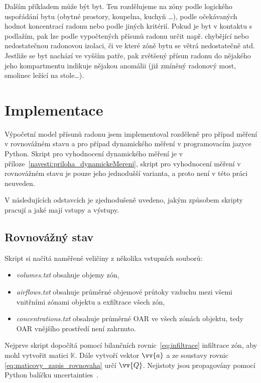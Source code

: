 Dalším příkladem může být byt. Ten rozdělujeme na zóny podle logického uspořádání bytu (obytné prostory, koupelna, kuchyň \ldots), podle očekávaných hodnot koncentrací radonu nebo podle jiných kritérií.
Pokud je byt v kontaktu s podlažím, pak lze podle vypočtených přísunů radonu určit např. chybějící nebo nedostatečnou radonovou izolaci, či ve které zóně bytu se větrá nedostatečně atd. Jestliže se byt nachází ve vyšším patře, pak zvětšený přísun radonu do nějakého jeho kompartmentu indikuje nějakou anomálii (již zmíněný radonový most, smolinec ležící na stole\ldots).

\section{Implementace}
Výpočetní model přísunů radonu jsem implementoval rozděleně pro případ měření v rovnovážném stavu a pro případ dynamického měření v programovacím jazyce Python. Skript pro vyhodnocení dynamického měření je v příloze~\ref{navesti:priloha_dynamickeMereni}, skript pro vyhodnocení měření v rovnovážném stavu je pouze jeho jednodušší varianta, a proto není v této práci neuveden.

V následujících odstavcích je zjednodušeně uvedeno, jakým způsobem skripty pracují a jaké mají vstupy a výstupy.
\subsection{Rovnovážný stav}
Skript si načítá naměřené veličiny z několika vstupních souborů:
\begin{itemize}
    \item\emph{volumes.txt} obsahuje objemy zón,
    \item\emph{airflows.txt} obsahuje průměrné objemové průtoky vzduchu mezi všemi  vnitřními zónami objektu a exfiltrace všech zón,
    \item\emph{concentrations.txt} obsahuje průměrné OAR ve všech zónách objektu, tedy OAR vnějšího prostředí není zahrnuto.
\end{itemize}

Nejprve skript dopočítá pomocí bilančních rovnic~\eqref{eq:infiltrace} infiltrace zón, aby mohl vytvořit matici $\mathbb{K}$. Dále vytvoří vektor $\vv{a}$ a ze soustavy rovnic \eqref{eq:maticovy_zapis_rovnovaha} určí $\vv{Q}$. Nejistoty jsou propagovány pomocí Python balíčku uncertainties~\cite{uncertainties}.

